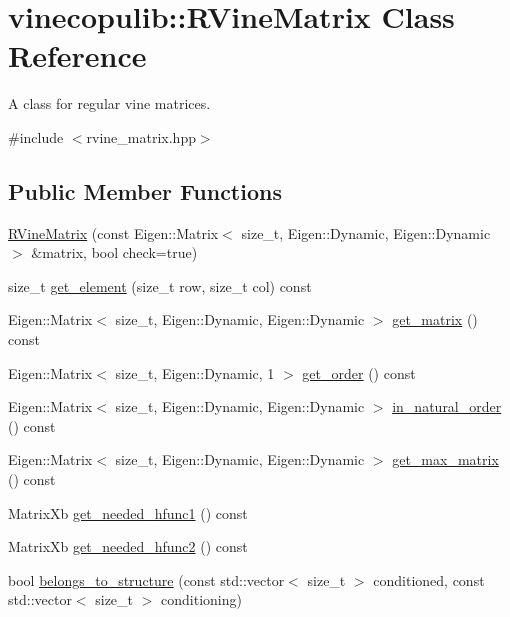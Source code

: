 \hypertarget{classvinecopulib_1_1_r_vine_matrix}{}\section{vinecopulib\+:\+:R\+Vine\+Matrix Class Reference}
\label{classvinecopulib_1_1_r_vine_matrix}


A class for regular vine matrices.  




{\ttfamily \#include $<$rvine\+\_\+matrix.\+hpp$>$}

\subsection*{Public Member Functions}
\begin{DoxyCompactItemize}
\item 
\hyperlink{classvinecopulib_1_1_r_vine_matrix_a966316e211937ae11e840ef7540a492f}{R\+Vine\+Matrix} (const Eigen\+::\+Matrix$<$ size\+\_\+t, Eigen\+::\+Dynamic, Eigen\+::\+Dynamic $>$ \&matrix, bool check=true)
\item 
size\+\_\+t \hyperlink{classvinecopulib_1_1_r_vine_matrix_a873a94d9065ec4e70f43245c5841741b}{get\+\_\+element} (size\+\_\+t row, size\+\_\+t col) const 
\item 
Eigen\+::\+Matrix$<$ size\+\_\+t, Eigen\+::\+Dynamic, Eigen\+::\+Dynamic $>$ \hyperlink{classvinecopulib_1_1_r_vine_matrix_a37c79233fca1e56e1535cbb37f8d3177}{get\+\_\+matrix} () const 
\item 
Eigen\+::\+Matrix$<$ size\+\_\+t, Eigen\+::\+Dynamic, 1 $>$ \hyperlink{classvinecopulib_1_1_r_vine_matrix_a71554c734c3cbb4c066c1f17fe94a284}{get\+\_\+order} () const 
\item 
Eigen\+::\+Matrix$<$ size\+\_\+t, Eigen\+::\+Dynamic, Eigen\+::\+Dynamic $>$ \hyperlink{classvinecopulib_1_1_r_vine_matrix_a4e63d8b01e1d89284ca28192676b8a3f}{in\+\_\+natural\+\_\+order} () const 
\item 
Eigen\+::\+Matrix$<$ size\+\_\+t, Eigen\+::\+Dynamic, Eigen\+::\+Dynamic $>$ \hyperlink{classvinecopulib_1_1_r_vine_matrix_aef8bbe14451d023e1c9c113e3812f574}{get\+\_\+max\+\_\+matrix} () const 
\item 
Matrix\+Xb \hyperlink{classvinecopulib_1_1_r_vine_matrix_a6303fc1f643fdf793c867ca7e08e42bc}{get\+\_\+needed\+\_\+hfunc1} () const 
\item 
Matrix\+Xb \hyperlink{classvinecopulib_1_1_r_vine_matrix_a7ac32cf10a966ba567142e9b36106746}{get\+\_\+needed\+\_\+hfunc2} () const 
\item 
bool \hyperlink{classvinecopulib_1_1_r_vine_matrix_a9ac94374329ca2cfee92ce676c7f1c2a}{belongs\+\_\+to\+\_\+structure} (const std\+::vector$<$ size\+\_\+t $>$ conditioned, const std\+::vector$<$ size\+\_\+t $>$ conditioning)
\end{DoxyCompactItemize}
